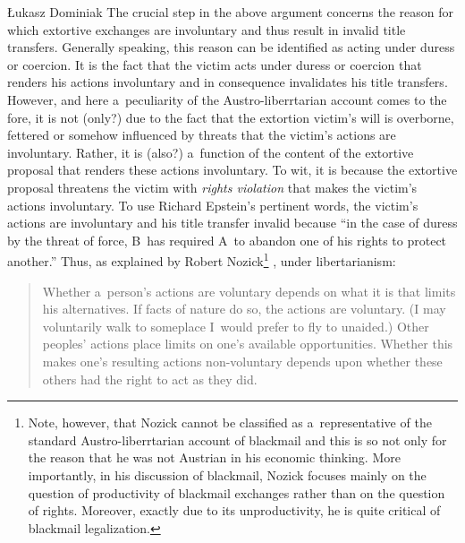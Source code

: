 \begin{artengenv}{Łukasz Dominiak}
The crucial step in the above argument concerns the reason for which extortive exchanges are involuntary and thus result in invalid title transfers. Generally speaking, this reason can be identified as acting under duress or coercion. It is the fact that the victim acts under duress or coercion that renders his actions involuntary and in consequence invalidates his title transfers. However, and here a~peculiarity of the Austro-liberrtarian account comes to the fore, it is not (only?) due to the fact that the extortion victim's will is overborne, fettered or somehow influenced by threats that the victim's actions are involuntary. Rather, it is (also?) a~function of the content of the extortive proposal that renders these actions involuntary. To wit, it is because the extortive proposal threatens the victim with \textit{rights violation} that makes the victim's actions involuntary. To use Richard Epstein's 
\parencite*[][p.296]{epstein_unconscionability_1975} %
 pertinent words, the victim's actions are involuntary and his title transfer invalid because ``in the case of duress by the threat of force, B~has required A~to abandon one of his rights to protect another.'' Thus, as explained by Robert Nozick\footnote{Note, however, that Nozick cannot be classified as a~representative of the standard Austro-liberrtarian account of blackmail and this is so not only for the reason that he was not Austrian in his economic thinking. More importantly, in his discussion of blackmail, Nozick focuses mainly on the question of productivity of blackmail exchanges rather than on the question of rights. Moreover, exactly due to its unproductivity, he is quite critical of blackmail legalization.} 
\parencite*[][p.262]{nozick_anarchy_1974}, %
 under libertarianism:



\begin{quote}
Whether a~person's actions are voluntary depends on what it is that limits his alternatives. If facts of nature do so, the actions are voluntary. (I may voluntarily walk to someplace I~would prefer to fly to unaided.) Other peoples' actions place limits on one's available opportunities. Whether this makes one's resulting actions non-voluntary depends upon whether these others had the right to act as they did.
\end{quote}




\end{artengenv}
